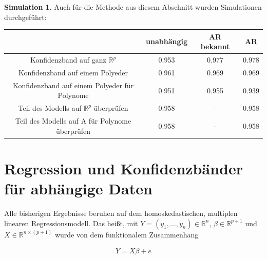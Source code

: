 \documentclass[12pt,a4paper]{article}
\theoremstyle{definition}
\theoremstyle{definition}
\theoremstyle{definition}
\newtheorem{Simulation}[Definition]{Simulation}
\theoremstyle{definition}
\newcommand{\UeberRR}{0.953}
\newcommand{\UeberRMinmax}{0.961}
\newcommand{\UeberRMinmaxPolyfast}{0.951}
\newcommand{\UeberARbekanntR}{0.977}
\newcommand{\UeberARbekanntMinmax}{0.969}
\newcommand{\UeberARbekanntMinmaxPolyfast}{0.955}
\newcommand{\UeberARR}{0.978}
\newcommand{\UeberARMinmax}{0.969}
\newcommand{\UeberARMinmaxPolyfast}{0.939}
\newcommand{\UeberRRpruefen}{0.958}
\newcommand{\UeberRMinmaxPolyfastpruefen}{0.958}
\newcommand{\UeberARbekanntRpruefen}{-}
\newcommand{\UeberARbekanntMinmaxPolyfastpruefen}{-}
\newcommand{\UeberARRpruefen}{0.958}
\newcommand{\UeberARMinmaxPolyfastpruefen}{0.958}
\begin{document}
\begin{Simulation}
Auch für die Methode aus diesem Abschnitt wurden Simulationen durchgeführt:

\begin{center}
\begin{tabular}{|c|c|c|c|}
\hline 
& unabhängig & AR bekannt & AR \\ 
\hline 
Konfidenzband auf ganz $\mathbb{R}^{p}$		 & \UeberRR		  & \UeberARbekanntR & \UeberARR \\ 
\hline 
Konfidenzband auf einem Polyeder	 & \UeberRMinmax  & \UeberARbekanntMinmax & \UeberARMinmax \\ 
\hline 
Konfidenzband auf einem Polyeder für Polynome  & \UeberRMinmaxPolyfast & \UeberARbekanntMinmaxPolyfast & \UeberARMinmaxPolyfast \\ 
\hline 
Teil des Modells auf $\mathbb{R}^{p}$ überprüfen 	& \UeberRRpruefen & \UeberARbekanntRpruefen & \UeberARRpruefen \\ 
\hline 
Teil des Modells auf A für Polynome überprüfen	& \UeberRMinmaxPolyfastpruefen & \UeberARbekanntMinmaxPolyfastpruefen & \UeberARMinmaxPolyfastpruefen \\ 
\hline 
\end{tabular} 
\end{center}

\end{Simulation}





\newpage
\section{Regression und Konfidenzbänder für abhängige Daten}
\label{Regression und Konfidenzbänder für abhaengige Daten}
Alle bisherigen Ergebnisse beruhen auf dem homoskedastischen, multiplen linearen Regressionsmodell. Das heißt, mit $Y=(y_1, \ldots, y_n) \in \mathbb{R}^n$, $\beta \in \mathbb{R}^{p+1}$ und $X \in \mathbb{R}^{n \times (p+1)}$ wurde von dem funktionalem Zusammenhang

\begin{align} \label{Grundmodell_AR}
Y = X \beta + e
\end{align}
\end{document}
